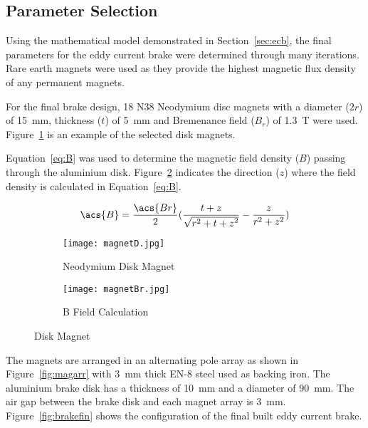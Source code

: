 \subsection{Parameter Selection}

Using the mathematical model demonstrated in Section~\ref{sec:ecb}, the final parameters for the eddy current brake were determined through many iterations. Rare earth magnets were used as they provide the highest magnetic flux density of any permanent magnets.

For the final brake design, 18 N38 Neodymium disc magnets with a diameter ($2r$) of \SI{15}{\milli\meter}, thickness ($t$) of \SI{5}{\milli\meter} and Bremenance field ($B_r$) of \SI{1.3}{\tesla} were used. Figure~\ref{fig:magN} is an example of the selected disk magnets. 

Equation~\ref{eq:B} was used to determine the magnetic field density ($B$) passing through the aluminium disk. Figure~\ref{fig:B0} indicates the direction ($z$) where the field density is calculated in Equation~\ref{eq:B}.

\begin{equation}
	\acs{B} = \frac{\acs{Br}}{2} (\frac{t+ z}{\sqrt{r^2 + {t + z}^2}} - \frac{z}{r^2 + z^2})
	\label{eq:B}
\end{equation}

\begin{figure}[H]
	\centering
	\begin{subfigure}{.4\textwidth}
		\centering
		\texttt{[image: magnetD.jpg]}
		\caption{Neodymium Disk Magnet}
		\label{fig:magN}
	\end{subfigure}%
	\begin{subfigure}{.4\textwidth}
		\centering
		\texttt{[image: magnetBr.jpg]}
		\caption{\ac{B} Field Calculation}
		\label{fig:B0}
	\end{subfigure}
	\caption{Disk Magnet}
	\citep[Addapted from][]{Supermagnete:2010}
	\label{fig:magnets}
\end{figure}

\vspace*{-0.5cm}

The magnets are arranged in an alternating pole array as shown in Figure~\ref{fig:magarr} with \SI{3}{\milli\meter} thick EN-8 steel used as backing iron. The aluminium brake disk has a thickness of \SI{10}{\milli\meter} and a diameter of \SI{90}{\milli\meter}. The air gap between the brake disk and each magnet array is \SI{3}{\milli\meter}. Figure~\ref{fig:brakefin} shows the configuration of the final built eddy current brake.

